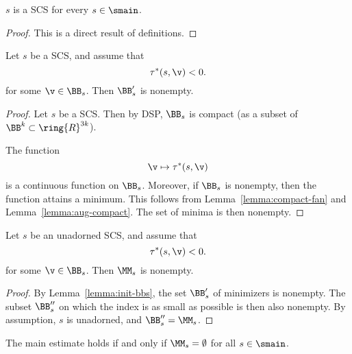 \begin{lemma}
$s$ is a SCS for every $s\in \smain$.
\end{lemma}

\begin{proof} This is a direct result of definitions.
\end{proof}


\begin{lemma}\label{lemma:init-bbs}
Let $s$ be a SCS, and assume that 
\[
\tau^*(s,\v)< 0.
\]
for some $\v\in \BB_s$.
Then $\BB'_s$ is nonempty.
\end{lemma}

\begin{proof} Let $s$ be a SCS. Then by DSP,
$\BB_s$ is compact (as a subset of
$\BB^k \subset \ring{R}^{3k}$). 

 The function 
\[
\v\mapsto \tau^*(s,\v)
\]
is a continuous function on $\BB_s$.  Moreover, if $\BB_s$ is
nonempty, then the function attains a minimum.  This follows from Lemma~\ref{lemma:compact-fan} and
Lemma~\ref{lemma:aug-compact}.  The set of minima is then nonempty.
\end{proof}

\begin{lemma}\label{lemma:init}
Let $s$ be an unadorned SCS, and assume that 
\[
\tau^*(s,\v)< 0.
\]
for some $\v\in \BB_s$.
Then $\MM_s$ is nonempty.
\end{lemma}

\begin{proof}    By Lemma~\ref{lemma:init-bbs}, the set 
$\BB'_s$ of minimizers is nonempty.   
The subset $\BB''_s$ on which the index is as small as possible
is then also nonempty.  By assumption, $s$  is unadorned, and
  $\BB''_s = \MM_s$.
\end{proof}


\begin{lemma}  
The main estimate holds if and only if $\MM_s=\emptyset$ for all $s\in\smain$.
\end{lemma}


